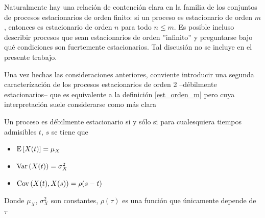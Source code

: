 Naturalmente hay una relaci\'on de contenci\'on clara en
la familia de los conjuntos de procesos estacionarios de orden finito:
si un proceso es estacionario de orden $m$, entonces es estacionario de orden $n$ para todo
$n \leq m$. Es posible incluso describir procesos que sean estacionarios de orden ''infinito''
y preguntarse bajo qu\'e condiciones son fuertemente estacionarios.
Tal discusi\'on no se incluye en el presente trabajo.


Una vez hechas
las consideraciones anteriores, conviente
introducir una segunda caracter\'izaci\'on de los procesos estacionarios de orden 2 --d\'ebilmente 
estacionarios--
que es equivalente
a la definici\'on \ref{est_orden_m} pero cuya interpretaci\'on suele considerarse como m\'as clara
\begin{thrm}
Un proceso es d\'ebilmente estacionario si y s\'olo si para cualesquiera tiempos admisibles
$t$, $s$ se tiene que
\begin{itemize}
\item $\mathrm{E}\left[ X(t) \right] = \mu_X$
\item $\mathrm{Var}\left( X(t) \right) = \sigma^{2}_X$
\item $\mathrm{Cov}\left( X(t),X(s) \right) = \rho (s-t)$
\end{itemize}
Donde $\mu_X$, $\sigma^{2}_X$ son constantes, $\rho(\tau)$
es una funci\'on que \'unicamente depende de $\tau$
\label{est_usual}
\end{thrm}


